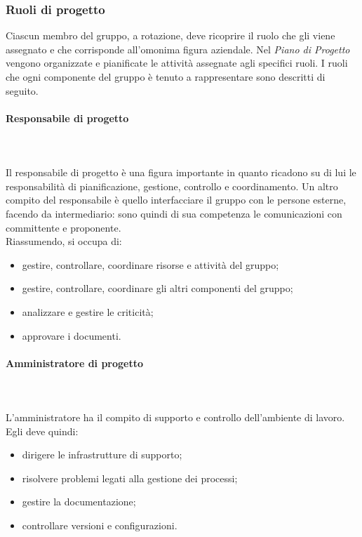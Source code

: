 		\subsubsection{Ruoli di progetto}
		Ciascun membro del gruppo, a rotazione, deve ricoprire il ruolo che gli viene assegnato e che corrisponde all'omonima figura aziendale. Nel \textit{Piano di Progetto} vengono organizzate e pianificate le attività assegnate agli specifici ruoli. I ruoli che ogni componente del gruppo è tenuto a rappresentare sono descritti di seguito.
			\paragraph{Responsabile di progetto} \mbox{}\\ \mbox{}\\
			Il responsabile di progetto è una figura importante in quanto ricadono su di lui le responsabilità di pianificazione, gestione, controllo e coordinamento. Un altro compito del responsabile è quello interfacciare il gruppo con le persone esterne, facendo da intermediario: sono quindi di sua competenza le comunicazioni con committente e proponente. \\
			Riassumendo, si occupa di:
			\begin{itemize}
				\item gestire, controllare, coordinare risorse e attività del gruppo;
				\item  gestire, controllare, coordinare gli altri componenti del gruppo;
				\item analizzare e gestire le criticità;
				\item approvare i documenti.
			\end{itemize}
			\paragraph{Amministratore di progetto} \mbox{}\\ \mbox{}\\
			L'amministratore ha il compito di supporto e controllo dell'ambiente di lavoro. \\
			Egli deve quindi:
			\begin{itemize}
				\item dirigere le infrastrutture di supporto;
				\item risolvere problemi legati alla gestione dei processi;
				\item gestire la documentazione;
				\item controllare versioni e configurazioni.%
			\end{itemize}
